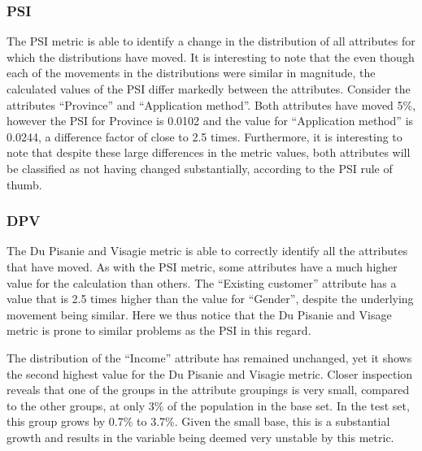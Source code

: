 \documentclass{article}
\theoremstyle{def}
\begin{document}
\subsubsection{PSI}

The PSI metric is able to identify a change in the distribution of all attributes for which the distributions have moved. It is interesting to note that the even though each of the movements in the distributions were similar in magnitude, the calculated values of the PSI differ markedly between the attributes. Consider the attributes ``Province'' and ``Application method''. Both attributes have moved 5\%, however the PSI for Province is 0.0102 and the value for ``Application method'' is 0.0244, a difference factor of close to 2.5 times. Furthermore, it is interesting to note that despite these large differences in the metric values, both attributes will be classified as not having changed substantially, according to the PSI rule of thumb.

\subsubsection{DPV}

The Du Pisanie and Visagie metric is able to correctly identify all the attributes that have moved. As with the PSI metric, some attributes have a much higher value for the calculation than others. The ``Existing customer'' attribute has a value that is 2.5 times higher than the value for ``Gender'', despite the underlying movement being similar. Here we thus notice that the Du Pisanie and Visage metric is prone to similar problems as the PSI in this regard.

The distribution of the ``Income'' attribute has remained unchanged, yet it shows the second highest value for the Du Pisanie and Visagie metric. Closer inspection reveals that one of the groups in the attribute groupings is very small, compared to the other groups, at only 3\% of the population in the base set. In the test set, this group grows by 0.7\% to 3.7\%. Given the small base, this is a substantial growth and results in the variable being deemed very unstable by this metric.

\end{document}
